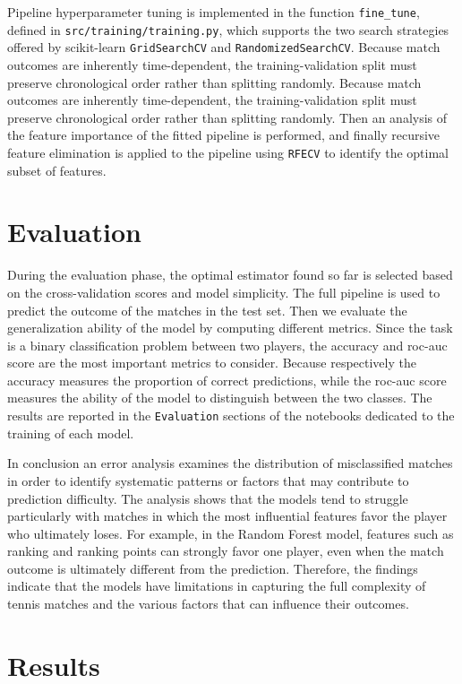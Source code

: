 \documentclass{article}
\begin{document}
Pipeline hyperparameter tuning is implemented in the function \texttt{fine\_tune}, defined in
\texttt{src/training/training.py}, which supports the two search strategies offered by scikit-learn 
\texttt{GridSearchCV} and \texttt{RandomizedSearchCV}. Because match outcomes are inherently time-dependent, 
the training-validation split must preserve chronological order rather than splitting randomly.
Because match outcomes are inherently time-dependent, the 
training-validation split must preserve chronological order rather than splitting randomly.
Then an analysis of the feature importance of the fitted pipeline is performed, and finally
recursive feature elimination is applied to the pipeline using 
\texttt{RFECV} to identify the optimal subset of features.

\section{Evaluation}

During the evaluation phase, the optimal estimator found so far is selected based on the cross-validation
 scores and model simplicity. The full pipeline is used to predict the outcome of the matches in the 
test set. 
Then we evaluate the generalization ability of the model by computing different metrics. Since the 
task is a binary classification problem between two players,
the accuracy and roc-auc score are the most important metrics to consider.
Because respectively the accuracy measures the proportion of correct predictions, while the roc-auc score measures the ability
of the model to distinguish between the two classes. 
The results are reported in the \texttt{Evaluation} sections of the
notebooks dedicated to the training of each model.

In conclusion an error analysis examines the distribution of misclassified 
matches in order to identify systematic patterns or factors that may contribute to prediction 
difficulty. The analysis shows that the models tend to struggle particularly with matches in which 
the most influential features favor the player who ultimately loses. For example, in the Random 
Forest model, features such as ranking and ranking points can strongly 
favor one player, even when the match outcome is ultimately different from the prediction.
Therefore, the findings indicate that the models have limitations in capturing the full 
complexity of tennis matches and the various factors that can influence their outcomes.

\section{Results}
\end{document}
